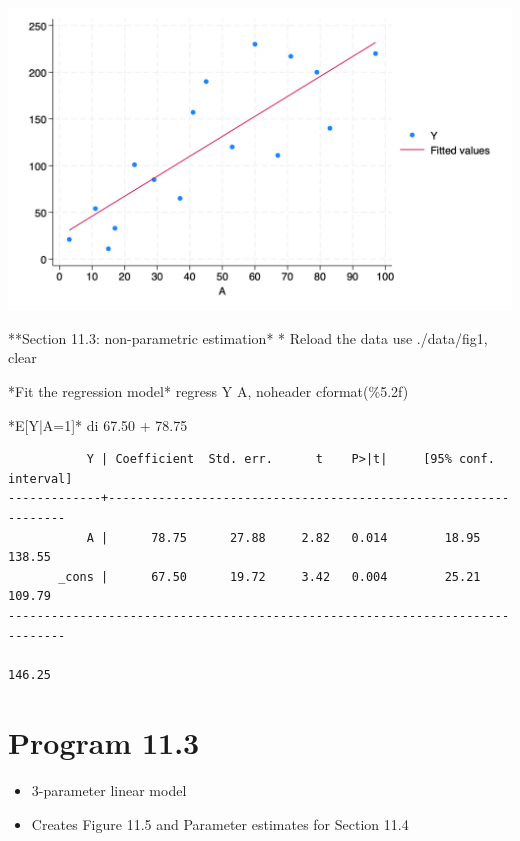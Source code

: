 \documentclass[
  10pt,
  a4paper,
]{book}
\newenvironment{Shaded}{\begin{snugshade}}{\end{snugshade}}
\newcommand{\KeywordTok}[1]{\textcolor[rgb]{0.00,0.46,0.62}{#1}}
\newcommand{\NormalTok}[1]{\textcolor[rgb]{0.00,0.46,0.62}{#1}}
\providecommand{\tightlist}{%
  \setlength{\itemsep}{0pt}\setlength{\parskip}{0pt}}
\begin{document}
\begin{center}\includegraphics[width=0.85\linewidth]{figs/stata-fig-11-4} \end{center}

\begin{Shaded}
\begin{Highlighting}[]
\NormalTok{**Section 11.3: non{-}parametric estimation*}
\NormalTok{* Reload the }\KeywordTok{data}
\KeywordTok{use}\NormalTok{ ./}\KeywordTok{data}\NormalTok{/fig1, }\KeywordTok{clear}

\NormalTok{*Fit the regression }\KeywordTok{model}\NormalTok{*}
\KeywordTok{regress}\NormalTok{ Y A, }\KeywordTok{noheader}\NormalTok{ cformat(\%5.2f)}

\NormalTok{*E[Y|A=1]*}
\KeywordTok{di}\NormalTok{ 67.50 + 78.75}
\end{Highlighting}
\end{Shaded}

\begin{verbatim}
           Y | Coefficient  Std. err.      t    P>|t|     [95% conf. interval]
-------------+----------------------------------------------------------------
           A |      78.75      27.88     2.82   0.014        18.95      138.55
       _cons |      67.50      19.72     3.42   0.004        25.21      109.79
------------------------------------------------------------------------------

146.25
\end{verbatim}

\section{Program 11.3}\label{program-11.3-1}

\begin{itemize}
\tightlist
\item
  3-parameter linear model
\item
  Creates Figure 11.5 and Parameter estimates for Section 11.4
\end{itemize}
\end{document}
